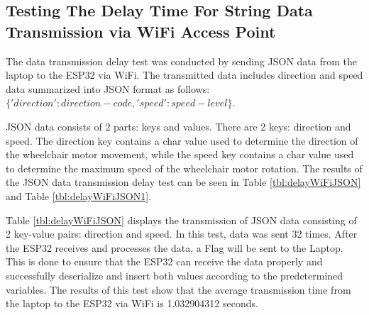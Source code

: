 \subsection{Testing The Delay Time For String Data Transmission via WiFi Access Point}

The data transmission delay test was conducted by sending JSON data from the laptop to the ESP32 via WiFi. The transmitted data includes direction and speed data summarized into JSON format as follows: \(\{'direction': direction-code, 'speed': speed-level\}\).

JSON data consists of 2 parts: keys and values. There are 2 keys: direction and speed. The direction key contains a char value used to determine the direction of the wheelchair motor movement, while the speed key contains a char value used to determine the maximum speed of the wheelchair motor rotation. The results of the JSON data transmission delay test can be seen in Table \ref{tbl:delayWiFiJSON} and Table \ref{tbl:delayWiFiJSON1}.

Table \ref{tbl:delayWiFiJSON} displays the transmission of JSON data consisting of 2 key-value pairs: direction and speed. In this test, data was sent 32 times. After the ESP32 receives and processes the data, a Flag will be sent to the Laptop. This is done to ensure that the ESP32 can receive the data properly and successfully deserialize and insert both values according to the predetermined variables. The results of this test show that the average transmission time from the laptop to the ESP32 via WiFi is 1.032904312 seconds.

